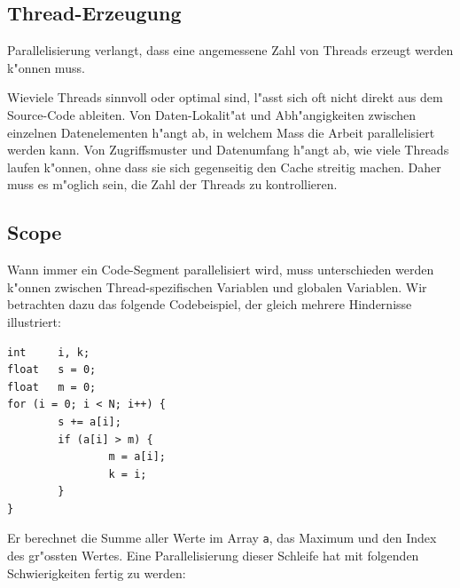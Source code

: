 \subsection{Thread-Erzeugung}
Parallelisierung verlangt, dass eine angemessene Zahl von Threads erzeugt
werden k"onnen muss.

Wieviele Threads sinnvoll oder optimal sind, l"asst sich oft nicht
direkt aus dem Source-Code ableiten.
Von
Daten-Lokalit"at und Abh"angigkeiten zwischen einzelnen Datenelementen
h"angt ab, in welchem Mass die Arbeit parallelisiert werden kann.
Von Zugriffsmuster und Datenumfang h"angt ab, wie viele Threads
laufen k"onnen, ohne dass sie sich gegenseitig den Cache streitig machen.
Daher muss es m"oglich sein, die Zahl der Threads zu kontrollieren.

\subsection{Scope}
Wann immer ein Code-Segment parallelisiert wird, muss unterschieden
werden k"onnen zwischen Thread-spezifischen Variablen und globalen
Variablen.
Wir betrachten dazu das folgende Codebeispiel, der gleich mehrere Hindernisse
illustriert: 
\begin{verbatim}
int     i, k;
float   s = 0;
float   m = 0;
for (i = 0; i < N; i++) {
        s += a[i];
        if (a[i] > m) {
                m = a[i];
                k = i;
        }
}
\end{verbatim}
Er berechnet die Summe aller Werte im Array {\tt a}, das Maximum und den
Index des gr"ossten Wertes.
Eine Parallelisierung dieser Schleife hat mit folgenden Schwierigkeiten
fertig zu werden:
